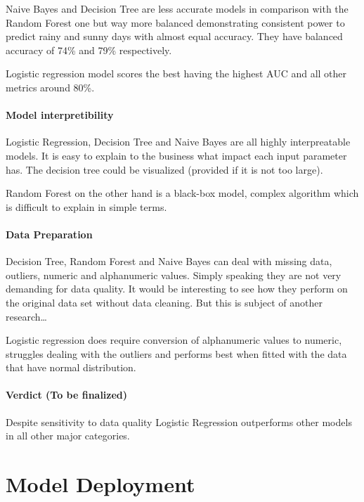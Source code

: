 Naive Bayes and Decision Tree are less accurate models in comparison
with the Random Forest one but way more balanced demonstrating
consistent power to predict rainy and sunny days with almost equal
accuracy. They have balanced accuracy of 74\% and 79\% respectively.

Logistic regression model scores the best having the highest AUC and all
other metrics around 80\%.

\hypertarget{model-interpretibility}{%
\paragraph{Model interpretibility}\label{model-interpretibility}}

Logistic Regression, Decision Tree and Naive Bayes are all highly
interpreatable models. It is easy to explain to the business what impact
each input parameter has. The decision tree could be visualized
(provided if it is not too large).

Random Forest on the other hand is a black-box model, complex algorithm
which is difficult to explain in simple terms.

\hypertarget{data-preparation-1}{%
\paragraph{Data Preparation}\label{data-preparation-1}}

Decision Tree, Random Forest and Naive Bayes can deal with missing data,
outliers, numeric and alphanumeric values. Simply speaking they are not
very demanding for data quality. It would be interesting to see how they
perform on the original data set without data cleaning. But this is
subject of another research\ldots{}

Logistic regression does require conversion of alphanumeric values to
numeric, struggles dealing with the outliers and performs best when
fitted with the data that have normal distribution.

\hypertarget{verdict-to-be-finalized}{%
\paragraph{Verdict (To be finalized)}\label{verdict-to-be-finalized}}

Despite sensitivity to data quality Logistic Regression outperforms
other models in all other major categories.

\hypertarget{model-deployment}{%
\section{Model Deployment}\label{model-deployment}}

